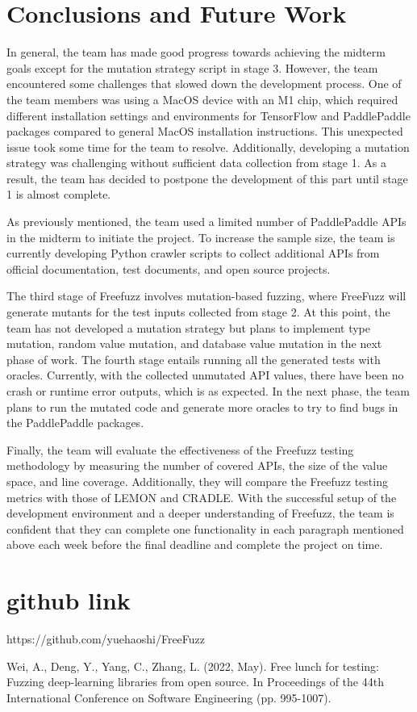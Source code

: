 \documentclass[sigconf]{acmart}
\begin{document}
\section{Conclusions and Future Work}
In general, the team has made good progress towards achieving the midterm goals except for the mutation strategy script in stage 3. However, the team encountered some challenges that slowed down the development process. One of the team members was using a MacOS device with an M1 chip, which required different installation settings and environments for TensorFlow and PaddlePaddle packages compared to general MacOS installation instructions. This unexpected issue took some time for the team to resolve. Additionally, developing a mutation strategy was challenging without sufficient data collection from stage 1. As a result, the team has decided to postpone the development of this part until stage 1 is almost complete.
\par As previously mentioned, the team used a limited number of PaddlePaddle APIs in the midterm to initiate the project. To increase the sample size, the team is currently developing Python crawler scripts to collect additional APIs from official documentation, test documents, and open source projects.
\par The third stage of Freefuzz involves mutation-based fuzzing, where FreeFuzz will generate mutants for the test inputs collected from stage 2. At this point, the team has not developed a mutation strategy but plans to implement type mutation, random value mutation, and database value mutation in the next phase of work. The fourth stage entails running all the generated tests with oracles. Currently, with the collected unmutated API values, there have been no crash or runtime error outputs, which is as expected. In the next phase, the team plans to run the mutated code and generate more oracles to try to find bugs in the PaddlePaddle packages.
\par Finally, the team will evaluate the effectiveness of the Freefuzz testing methodology by measuring the number of covered APIs, the size of the value space, and line coverage. Additionally, they will compare the Freefuzz testing metrics with those of LEMON and CRADLE.
With the successful setup of the development environment and a deeper understanding of Freefuzz, the team is confident that they can complete one functionality in each paragraph mentioned above each week before the final deadline and complete the project on time.

\section{github link}
https://github.com/yuehaoshi/FreeFuzz
\begin{thebibliography}{9}
 Wei, A., Deng, Y., Yang, C.,  Zhang, L. (2022, May). Free lunch for testing: Fuzzing deep-learning libraries from open source. In Proceedings of the 44th International Conference on Software Engineering (pp. 995-1007).
\end{thebibliography}
\end{document}
